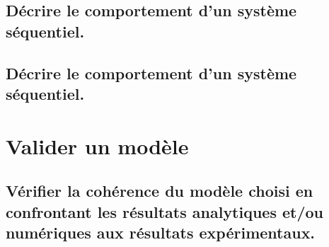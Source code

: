 \documentclass[10pt,fleqn]{book}
\newcommand{\repRel}{../..}
\newcommand{\repStyle}{\repRel/Style}
\newcommand{\td}{fichier_td}
\newcommand{\repExos}{\repRel/ExercicesCompetences}
\newcommand{\repExo}{dossier}
\begin{document}
\renewcommand{\repExo}{\repExos/B2_ProposerModele/B2_16_Hyperstatisme/71_Robovolc}
\renewcommand{\td}{71_Robovolc}
\graphicspath{{\repStyle/png/}{\repExo/images/}}


\renewcommand{\repExo}{\repExos/B2_ProposerModele/B2_16_Hyperstatisme/71_Robovolc_02}
\renewcommand{\td}{71_Robovolc_02}
\graphicspath{{\repStyle/png/}{\repExo/images/}}


\renewcommand{\repExo}{\repExos/B2_ProposerModele/B2_16_Hyperstatisme/72_Tripteor}
\renewcommand{\td}{72_Tripteor}
\graphicspath{{\repStyle/png/}{\repExo/images/}}


\renewcommand{\repExo}{\repExos/B2_ProposerModele/B2_16_Hyperstatisme/81_Piaggio}
\renewcommand{\td}{81_Piaggio}
\graphicspath{{\repStyle/png/}{\repExo/images/}}


\renewcommand{\repExo}{\repExos/B2_ProposerModele/B2_16_Hyperstatisme/82_MAV}
\renewcommand{\td}{82_MAV}
\graphicspath{{\repStyle/png/}{\repExo/images/}}


\renewcommand{\repExo}{\repExos/B2_ProposerModele/B2_16_Hyperstatisme/83_Roburoc}
\renewcommand{\td}{79_Roburoc}
\graphicspath{{\repStyle/png/}{\repExo/images/}}


\subsection{Décrire le comportement d'un système séquentiel.} 

\subsection{Décrire le comportement d'un système séquentiel.} 

\renewcommand{\repExo}{\repExos/B2_ProposerModele/B2_17_Sequentiel/50_BancBalafre}
\renewcommand{\td}{50_BancBalafre}
\graphicspath{{\repStyle/png/}{\repExo/images/}}


\section{Valider un modèle} 

\subsection{Vérifier la cohérence du modèle choisi en confrontant les résultats analytiques et/ou numériques aux résultats expérimentaux.} 
\end{document}
